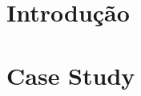 \documentclass[a4paper,10pt,openright,openbib,twocolumn]{article}
\begin{document}
\title{}
\date{\today}
\begin{multicols}{2}
\author{
    Brito, Rui\\
    PG22781\\
    Universidade do Minho\\
    ruibrito666@gmail.com
  \and
    Silva, António\\
    PG22820\\
    Universidade do Minho\\
    anolsi@live.com
}
\date{}
\maketitle
\end{multicols}

\begin{abstract}
\end{abstract}

\section{Introdução} 

\section{Case Study}
\label{sec:casestudy}
\end{document}
